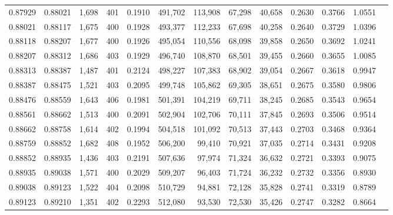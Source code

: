 \begin{tabular}{rrrrrrrrrrrrr}
0.87929 & 0.88021 & 1,698 & 401 &                                     0.1910 & 491,702 & 113,908 &  67,298 &  40,658 & 0.2630 & 0.3766 & 1.0551 \\
0.88021 & 0.88117 & 1,675 & 400 &                                     0.1928 & 493,377 & 112,233 &  67,698 &  40,258 & 0.2640 & 0.3729 & 1.0396 \\
0.88118 & 0.88207 & 1,677 & 400 &                                     0.1926 & 495,054 & 110,556 &  68,098 &  39,858 & 0.2650 & 0.3692 & 1.0241 \\
0.88207 & 0.88312 & 1,686 & 403 &                                     0.1929 & 496,740 & 108,870 &  68,501 &  39,455 & 0.2660 & 0.3655 & 1.0085 \\
0.88313 & 0.88387 & 1,487 & 401 &                                     0.2124 & 498,227 & 107,383 &  68,902 &  39,054 & 0.2667 & 0.3618 & 0.9947 \\
0.88387 & 0.88475 & 1,521 & 403 &                                     0.2095 & 499,748 & 105,862 &  69,305 &  38,651 & 0.2675 & 0.3580 & 0.9806 \\
0.88476 & 0.88559 & 1,643 & 406 &                                     0.1981 & 501,391 & 104,219 &  69,711 &  38,245 & 0.2685 & 0.3543 & 0.9654 \\
0.88561 & 0.88662 & 1,513 & 400 &                                     0.2091 & 502,904 & 102,706 &  70,111 &  37,845 & 0.2693 & 0.3506 & 0.9514 \\
0.88662 & 0.88758 & 1,614 & 402 &                                     0.1994 & 504,518 & 101,092 &  70,513 &  37,443 & 0.2703 & 0.3468 & 0.9364 \\
0.88759 & 0.88852 & 1,682 & 408 &                                     0.1952 & 506,200 &  99,410 &  70,921 &  37,035 & 0.2714 & 0.3431 & 0.9208 \\
0.88852 & 0.88935 & 1,436 & 403 &                                     0.2191 & 507,636 &  97,974 &  71,324 &  36,632 & 0.2721 & 0.3393 & 0.9075 \\
0.88935 & 0.89038 & 1,571 & 400 &                                     0.2029 & 509,207 &  96,403 &  71,724 &  36,232 & 0.2732 & 0.3356 & 0.8930 \\
0.89038 & 0.89123 & 1,522 & 404 &                                     0.2098 & 510,729 &  94,881 &  72,128 &  35,828 & 0.2741 & 0.3319 & 0.8789 \\
0.89123 & 0.89210 & 1,351 & 402 &                                     0.2293 & 512,080 &  93,530 &  72,530 &  35,426 & 0.2747 & 0.3282 & 0.8664 \\

\end{tabular}
